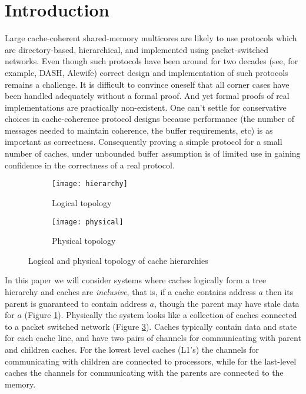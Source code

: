 \section{Introduction} 

Large cache-coherent shared-memory multicores are likely to use protocols which
are directory-based, hierarchical, and implemented using packet-switched networks.  Even
though such protocols have been around for two decades (see, for example,
DASH\cite{DASH}, Alewife\cite{Anant}) correct design and implementation of
such protocols remains a challenge. It is difficult to convince oneself that
all corner cases have been handled adequately without a formal proof. And yet
formal proofs of real implementations are practically non-existent. One can't
settle for conservative choices in cache-coherence protocol designs because
performance (\eg the number of messages needed to maintain coherence, the
buffer requirements, etc) is as important as correctness. Consequently proving
a simple protocol for a small number of caches, under unbounded buffer
assumption is of limited use in gaining confidence in the correctness of a real
protocol. 

\begin{figure}
\centering
\begin{subfigure}{.45\linewidth}
\centering
\texttt{[image: hierarchy]}
\caption{Logical topology}
\label{hierarchy}
\end{subfigure}
\begin{subfigure}{.45\linewidth}
\centering
\texttt{[image: physical]}
\caption{Physical topology}
\label{physical}
\end{subfigure}
\caption{Logical and physical topology of cache hierarchies}
\end{figure}

In this paper we will consider systems where caches logically form a tree
hierarchy and caches are \emph{inclusive}, that is, if a cache contains address
$a$ then its parent is guaranteed to contain address $a$, though the parent may
have stale data for $a$ (Figure \ref{hierarchy}). Physically the system looks
like a collection of caches connected to a packet switched network (Figure
\ref{physical}). Caches typically contain data and state for each cache line,
and have two pairs of channels for communicating with parent and children
caches. For the lowest level caches (L1's) the channels for communicating with
children are connected to processors, while for the last-level caches the
channels for communicating with the parents are connected to the memory. 

